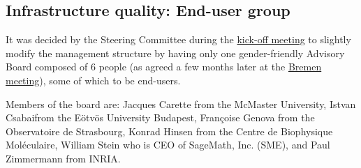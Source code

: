 \documentclass{deliverablereport}
\begin{document}
\subsection{Infrastructure quality: End-user group}


It was decided by the Steering Committee during the
\href{http://opendreamkit.org/meetings/2015-09-02-Kickoff/management_structure/}{kick-off
  meeting} to slightly modify the management structure by having only
one gender-friendly Advisory Board composed of 6 people (as agreed a
few months later at the
\href{http://opendreamkit.org/meetings/2016-06-27-Bremen/minutes/}{Bremen
  meeting}), some of which to be end-users.

Members of the board are: Jacques Carette from the McMaster University, Istvan Csabaifrom the Eötvös University Budapest,
Françoise Genova from the Observatoire de Strasbourg, Konrad Hinsen from the Centre de Biophysique Moléculaire, 
William Stein who is CEO of SageMath, Inc. (SME), and Paul Zimmermann from INRIA.



\printbibliography
\end{document}
